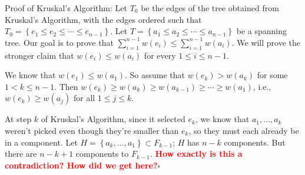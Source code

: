 \documentclass[10pt,letterpaper]{article}
\newcommand{\n}{\hfill\break}
\newcommand{\proven}{\;$\square$\n}
\newcommand{\set}[1]{\left\{#1\right\}}
\newcommand{\flag}[1]{\textbf{\textcolor{red}{#1}}}
\begin{document}
\par\noindent Proof of Kruskal's Algorithm: Let $T_{0}$ be the edges of the tree obtained from Kruskal's Algorithm, with the edges ordered such that $T_{0}=\set{e_{1}\le{}e_{2}\le\cdots\le{}e_{n-1}}$. Let $T=\set{a_{1}\le{}a_{2}\le\cdots\le{}a_{n-1}}$ be a spanning tree. Our goal is to prove that $\sum_{i=1}^{n-1}w(e_{i})\le\sum_{i=1}^{n-1}w(a_{i})$. We will prove the stronger claim that $w(e_{i})\le{}w(a_{i})$ for every $1\le{}i\le{}n-1$.\n

\par\noindent We know that $w(e_{1})\le{}w(a_{1})$. So assume that $w(e_{k})>w(a_{k})$ for some $1<k\le{}n-1$.\n
Then $w(e_{k})\ge{}w(a_{k})\ge{}w(a_{k-1})\ge\cdots\ge{}w(a_{1})$, i.e., $w(e_{k})\ge{}w(a_{j})$ for all $1\le{}j\le{}k$.\n

\par\noindent At step $k$ of Kruskal's Algorithm, since it selected $e_{k}$, we know that $a_{1},\ldots,a_{k}$ weren't picked even though they're smaller than $e_{k}$, so they must each already be in a component. Let $H=\set{a_{k},\ldots,a_{1}}\subset{}F_{k-1}$; $H$ has $n-k$ components. But there are $n-k+1$ components to $F_{k-1}$. \flag{How exactly is this a contradiction? How did we get here?}\proven
\end{document}
